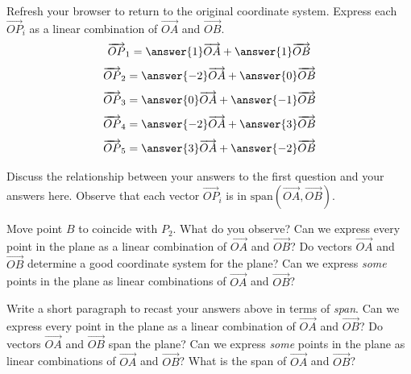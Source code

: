 \documentclass{ximera}
\begin{document}
\begin{exploration}
\begin{question}
    Refresh your browser to return to the original coordinate system.  Express each $\overrightarrow{OP}_i$ as a linear combination of $\overrightarrow{OA}$ and $\overrightarrow{OB}$.
$$\overrightarrow{OP}_1=\answer{1}\overrightarrow{OA}+\answer{1}\overrightarrow{OB}$$
$$\overrightarrow{OP}_2=\answer{-2}\overrightarrow{OA}+\answer{0}\overrightarrow{OB}$$
$$\overrightarrow{OP}_3=\answer{0}\overrightarrow{OA}+\answer{-1}\overrightarrow{OB}$$
$$\overrightarrow{OP}_4=\answer{-2}\overrightarrow{OA}+\answer{3}\overrightarrow{OB}$$
$$\overrightarrow{OP}_5=\answer{3}\overrightarrow{OA}+\answer{-2}\overrightarrow{OB}$$

Discuss the relationship between your answers to the first question and your answers here.  Observe that each vector $\overrightarrow{OP}_i$ is in $\text{span}\left(\overrightarrow{OA},\overrightarrow{OB}\right)$.
\end{question}

\begin{question}
    Move point $B$ to coincide with $P_2$.  What do you observe?  Can we express every point in the plane as a linear combination of $\overrightarrow{OA}$ and $\overrightarrow{OB}$? Do vectors $\overrightarrow{OA}$ and $\overrightarrow{OB}$ determine a good coordinate system for the plane? Can we express \textit{some} points in the plane as linear combinations of $\overrightarrow{OA}$ and $\overrightarrow{OB}$?  

    Write a short paragraph to recast your answers above in terms of \textit{span}.  Can we express every point in the plane as a linear combination of $\overrightarrow{OA}$ and $\overrightarrow{OB}$? Do vectors $\overrightarrow{OA}$ and $\overrightarrow{OB}$ span the plane?  Can we express \textit{some} points in the plane as linear combinations of $\overrightarrow{OA}$ and $\overrightarrow{OB}$?  What is the span of $\overrightarrow{OA}$ and $\overrightarrow{OB}$?
\end{question}

\end{exploration}
\end{document}
